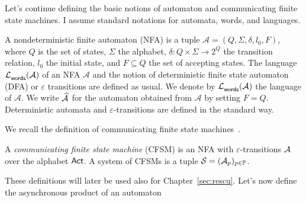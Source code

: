 Let's continue defining the basic notions of
automaton and communicating finite state machines.
I assume standard notations for automata, words, and languages. 
\begin{definition}[NFA]
    A nondeterministic finite automaton (NFA) is a tuple 
    $\mathcal A = (Q, \Sigma, \delta, l_0, F)$, where $Q$ is the set of states, 
    $\Sigma$ the alphabet, $\delta : Q \times \Sigma \to 2^Q$ the transition relation, 
    $l_0$ the initial state, and $F \subseteq Q$ the set of accepting states. 
    The language $\mathcal{L}_{\mathsf{words}}^{}(\mathcal A)$ of an NFA $\mathcal A$ and the notion of deterministic
    finite state automaton (DFA) or $\varepsilon$ transitions are defined as usual.
    We denote by $\mathcal{L}_{\mathsf{words}}^{}(\mathcal A)$ the language of $\mathcal A$. 
    We write $\widehat{\mathcal A}{}$ for the automaton obtained from $\mathcal A$ by setting $F=Q$.
    Deterministic automata and $\varepsilon$-transitions are defined in the standard way.  
\end{definition}

We recall the definition of communicating finite state machines~\cite{BrandZafiropulo}.

\begin{definition}[CFSM] \label{def:cfsm}
    A \emph{communicating finite state machine} (CFSM) is an NFA with 
    $\varepsilon$-transitions $\mathcal{A}$ over the alphabet $\mathsf{Act}$.  
    A system of CFSMs is a tuple $\mathcal{S} = (\mathcal{A}_p)_{p \in \mathbb{P}}$.
\end{definition}

These definitions will later be used also for Chapter~\ref{sec:rescu}.
Let's now define the asynchronous product of an automaton

